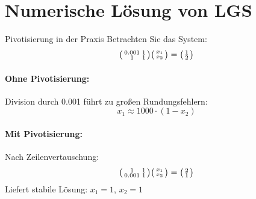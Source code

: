 \section{Numerische Lösung von LGS}

\begin{example2}{Pivotisierung in der Praxis}
Betrachten Sie das System:
$$\begin{psmallmatrix}
0.001 & 1\\
1 & 1
\end{psmallmatrix}
\begin{psmallmatrix}
x_1\\
x_2
\end{psmallmatrix} = 
\begin{psmallmatrix}
1\\
2
\end{psmallmatrix}$$

\paragraph{Ohne Pivotisierung:}
Division durch 0.001 führt zu großen Rundungsfehlern:
$$x_1 \approx 1000 \cdot (1 - x_2)$$

\paragraph{Mit Pivotisierung:}
Nach Zeilenvertauschung:
$$\begin{psmallmatrix}
1 & 1\\
0.001 & 1
\end{psmallmatrix}
\begin{psmallmatrix}
x_1\\
x_2
\end{psmallmatrix} = 
\begin{psmallmatrix}
2\\
1
\end{psmallmatrix}$$
Liefert stabile Lösung: $x_1 = 1$, $x_2 = 1$
\end{example2}

